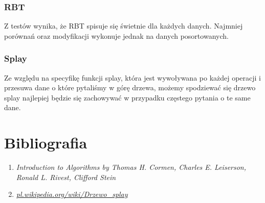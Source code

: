 \documentclass[10pt,a4paper]{article}
\theoremstyle{definition}
\theoremstyle{definition}
\theoremstyle{definition}
\begin{document}
        \subsubsection{RBT}
            Z testów wynika, że RBT spisuje się świetnie dla każdych danych. Najmniej porównań oraz modyfikacji wykonuje jednak na danych posortowanych.
        \subsubsection{Splay}
            Ze względu na specyfikę funkcji splay, która jest wywoływana po każdej operacji i przesuwa dane o które pytaliśmy w górę drzewa, możemy spodziewać się drzewo splay najlepiej będzie się zachowywać w przypadku częstego pytania o te same dane.
\section{Bibliografia}
    \begin{enumerate}
        \item \textit{Introduction to Algorithms by Thomas H. Cormen, Charles E. Leiserson, Ronald L. Rivest, Clifford Stein}
        \item \href{https://pl.wikipedia.org/wiki/Drzewo_splay}{\textit{pl.wikipedia.org/wiki/Drzewo\_splay}}
    \end{enumerate}{}
    
\end{document}
